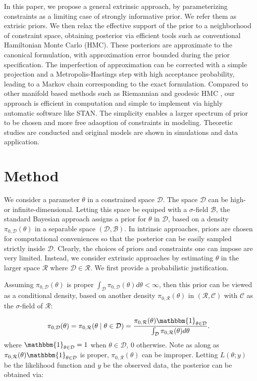 \documentclass[10pt]{article}
\newcommand{\mc}[1]{\mathcal{#1}}
\begin{document}
In this paper, we propose a general extrinsic approach, by parameterizing constraints as a limiting case of strongly informative prior. We refer them as extrisic priors. We then relax the effective support of the prior to a neighborhood of constraint space, obtaining posterior via efficient tools such as conventional Hamiltonian Monte Carlo (HMC). These posteriors are approximate to the canonical formulation, with approximation error bounded during the prior specification. The imperfection of approximation can be corrected with a simple projection and a Metropolis-Hastings step with high acceptance probability, leading to a Markov chain corresponding to the exact formulation. Compared to other manifold based methods such as Riemannian and geodesic HMC \citep{girolami2011riemann,byrne2013geodesic}, our approach is efficient in computation and simple to implement via highly automatic software like STAN. The simplicity enables a larger spectrum of prior to be chosen and more free adaoption of constraints in modeling. Theoretic studies are conducted and original models are shown in simulations and data application.

\section{Method}

We consider a parameter $\theta$ in a constrained space $\mc D$. The space $\mc D$ can be high- or infinite-dimensional. Letting this space be equiped with a $\sigma$-field $\mathscr B$, the standard Bayesian approach assigns a prior for $\theta$ in $\mc D$, based on a density $\pi_{0,\mc D}(\theta)$ in a separable space $(\mc D, \mathscr B)$. In intrinsic approaches, priors are chosen for computational conveniences so that the posterior can be easily sampled strictly inside $\mc D$. Clearly, the choices of priors and constraints one can impose are very limited. Instead, we consider extrinsic approaches by estimating $\theta$ in the larger space $\mc R$ where $\mc D\in \mc R$. We first provide a probabilistic justification.


Assuming $\pi_{0,\mc D}(\theta)$ is proper $\int_{\mc D} \pi_{0,\mc D}(\theta) d\theta <\infty$, then this prior can be viewed as a conditional density, based on another density $\pi_{0,\mc R}(\theta)$ in $(\mc R, \mathscr C)$ with $\mathscr C$ as the $\sigma$-field of $\mc R$:

\begin{equation}
\begin{aligned}
\pi_{0,\mc D}(\theta)= \pi_{0,\mc R}(\theta \mid \theta \in \mc D) = \frac{ \pi_{0,\mc R}(\theta) \mathbbm{1}_{\theta\in \mc D} }{ \int_{\mc D}  \pi_{0,\mc R}(\theta)d\theta }.
\end{aligned}
\end{equation}
where $\mathbbm{1}_{\theta \in \mc D}=1$ when $\theta \in \mc D$, $0$ otherwise. Note  as along as $\pi_{0,\mc R}(\theta) \mathbbm{1}_{\theta\in \mc D}$ is proper, $\pi_{0,\mc R}(\theta)$ can be improper. Letting $L(\theta;y)$ be the likelihood function and $y$ be the observed data, the posterior can be obtained via:
\end{document}

